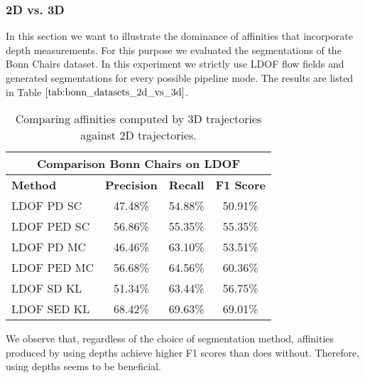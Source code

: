 \subsubsection{2D vs. 3D}
In this section we want to illustrate the dominance of affinities that incorporate depth measurements. For this purpose we evaluated the segmentations of the Bonn Chairs dataset. In this experiment we strictly use LDOF flow fields and generated segmentations for every possible pipeline mode. The results are listed in Table $\ref{tab:bonn_datasets_2d_vs_3d}$.
\begin{table}[H]
\centering
\begin{tabular}{|l|c|c|c|}
\hline
\multicolumn{4}{|c|}{Comparison Bonn Chairs on LDOF}                        \\ \hline
\textbf{Method} & \textbf{Precision} & \textbf{Recall} & \textbf{F1 Score}  \\ \hline
LDOF PD SC & 47.48\% & 54.88\% & 50.91\% \\ \hline
LDOF PED SC & 56.86\% & 55.35\% & 55.35\% \\ \hline
LDOF PD MC & 46.46\% & 63.10\% & 53.51\% \\ \hline
LDOF PED MC & 56.68\% & 64.56\% & 60.36\% \\ \hline              
LDOF SD KL & 51.34\% & 63.44\% & 56.75\% \\ \hline
LDOF SED KL & 68.42\% & 69.63\% & 69.01\% \\ \hline
\end{tabular}
\caption[2D vs. 3D: Bonn Datasets]{Comparing affinities computed by 3D trajectories against 2D trajectories.}
\label{tab:bonn_datasets_2d_vs_3d}
\end{table}
We observe that, regardless of the choice of segmentation method, affinities produced by using depths achieve higher F1 scores than does without. Therefore, using depths seems to be beneficial.

